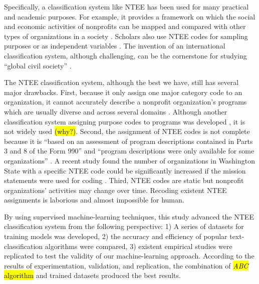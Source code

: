 \documentclass[12pt]{article}
\begin{document}
Specifically, a classification system like NTEE has been used for many practical and academic purposes. For example, it provides a framework on which the social and economic activities of nonprofits can be mapped and compared with other types of organizations in a society \parencite[e.g.,][]{RoegerNonprofitSectorIts2015}. Scholars also use NTEE codes for sampling purposes \parencite[e.g.,][]{OktenDeterminantsdonationsprivate2000a,CarmanEvaluationCapacityNonprofit2010} or as independent variables \parencite{SloanEffectsNonprofitAccountability2009}. The invention of an international classification system, although challenging, can be the cornerstone for studying ``global civil society'' \parencite{VakilConfrontingclassificationproblem1997,Salamonsearchnonprofitsector1992,Salamoninternationalclassificationnonprofit1996}.

The NTEE classification system, although the best we have, still has several major drawbacks. First, because it only assign one major category code to an organization, it cannot accurately describe a nonprofit organization's programs which are usually diverse and across several domains \parencite[303]{GronbjergUsingNTEEclassify1994}. Although another classification system assigning purpose codes to programs was developed \parencite{LampkinIntroducingNonprofitProgram2001}, it is not widely used \hl{(why?)}. Second, the assignment of NTEE codes is not complete because it is ``based on an assessment of program descriptions contained in Parts 3 and 8 of the Form 990'' and ``program descriptions were only available for some organizations'' \parencite[16]{NationalCenterforCharitableStatisticsGuideUsingNCCS2006}. A recent study found the number of organizations in Washington State with a specific NTEE code could be significantly increased if the mission statements were used for coding \parencite{FyallNTEECodesOpportunities2018}. Third, NTEE codes are static but nonprofit organizations' activities may change over time. Recoding existent NTEE assignments is laborious and almost impossible for human.

By using supervised machine-learning techniques, this study advanced the NTEE classification system from the following perspective: 1) A series of datasets for training models was developed, 2) the accuracy and efficiency of popular text-classification algorithms were compared, 3) existent empirical studies were replicated to test the validity of our machine-learning approach. According to the results of experimentation, validation, and replication, the combination of \hl{\textit{ABC} algorithm} and trained datasets produced the best results.
\end{document}
